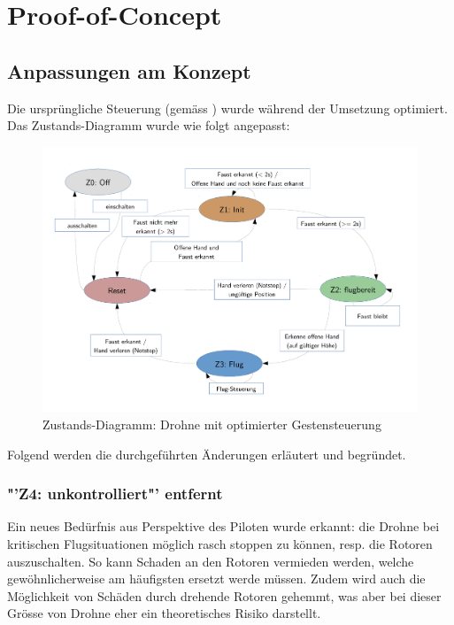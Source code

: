 \chapter{Proof-of-Concept}

\section{Anpassungen am Konzept}
\label{sec:poc:conceptChanges}
Die ursprüngliche Steuerung (gemäss ) wurde während der Umsetzung optimiert.\\
Das Zustands-Diagramm wurde wie folgt angepasst:
\begin{figure}[H]
	\centering
	\includegraphics[width=1.0\textwidth]{figures/concept/state-diagram-2.pdf}
	\caption[Zustands-Diagramm: Drohne mit optimierter Gestensteuerung optimiert]{Zustands-Diagramm: Drohne mit optimierter Gestensteuerung}
\end{figure}

Folgend werden die durchgeführten Änderungen erläutert und begründet.

\subsection{"'Z4: unkontrolliert"' entfernt}
Ein neues Bedürfnis aus Perspektive des Piloten wurde erkannt: die Drohne bei kritischen Flugsituationen möglich rasch stoppen zu können, resp. die Rotoren auszuschalten.
So kann Schaden an den Rotoren vermieden werden, welche gewöhnlicherweise am häufigsten ersetzt werde müssen.
Zudem wird auch die Möglichkeit von Schäden durch drehende Rotoren gehemmt, was aber bei dieser Grösse von Drohne eher ein theoretisches Risiko darstellt.

